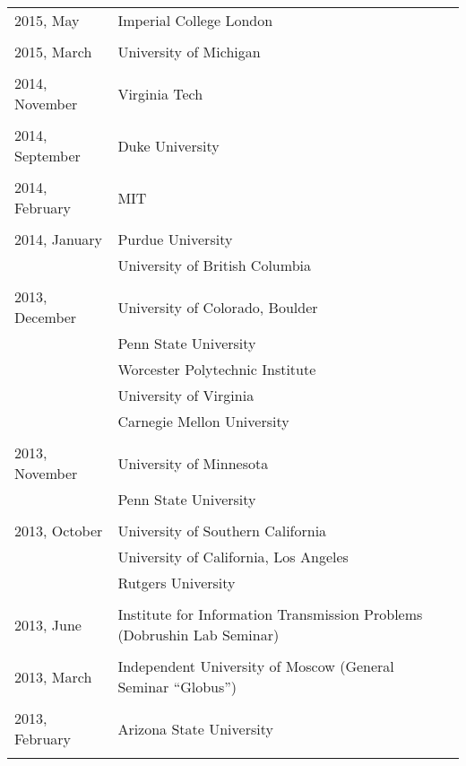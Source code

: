 \documentclass[letterpaper,11pt]{article}
\begin{document}
\begin{longtable}{llc}
	2015, May
	& Imperial College London
	\\\\

	2015, March
	& University of Michigan
	\\\\

	2014, November
	& Virginia Tech\\\\

	2014, September
	& Duke University\\\\

	2014, February
	& MIT\\\\

	2014, January
	  & Purdue University & \hspace{110pt}
	\\& University of British Columbia \\\\

	2013, December
	& University of Colorado, Boulder
	\\&Penn State University\\&Worcester Polytechnic Institute
	\\&University of Virginia\\&
	Carnegie Mellon University \\\\

	2013, November&
	University of Minnesota \\&
	Penn State University \\\\

	2013, October&
	University of Southern California
	\\&
	University of California, Los Angeles
	\\&Rutgers University\\\\

	2013, June& Institute for Information Transmission Problems
	(Dobrushin Lab Seminar)\\\\

	2013, March& Independent University of Moscow (General Seminar
	``Globus'')\\\\

	2013, February & Arizona State University\\\\


\end{longtable}
\end{document}
